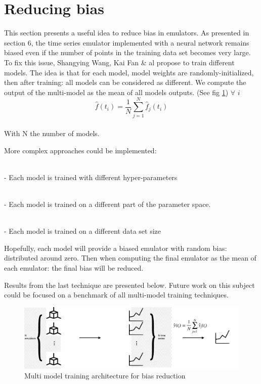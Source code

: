 \documentclass{article}
\begin{document}
\section{Reducing bias}
This section presents a useful idea to reduce bias in emulators. As presented in section 6, the time series emulator implemented with a neural network remains biased even if the number of points in the training data set becomes very large. To fix this issue, Shangying Wang, Kai Fan & al  \cite{emulation_using_NN} propose to train different models.  The idea is that for each model, model weights are randomly-initialized, then after training: all models can be considered as different. We compute the output of the multi-model as the mean of all models outputs. (See fig \ref{fig: multi_model})
$\forall$ $i$
\begin{equation}
    \hat{f}(t_i)= \frac{1}{N} \sum^N_{j=1} \hat{f}_j(t_i)
\end{equation}
 \\ 
With N the number of models.

More complex approaches could be implemented: 

\\ - Each model is trained with different hyper-parameters

\\ - Each model is trained on a different part of the parameter space.

\\ - Each model is trained on a different data set size 

Hopefully, each model will provide a biased emulator with random bias: distributed around zero. Then when computing the final emulator as the mean of each emulator: the final bias will be reduced.    

Results from the last technique are presented below. Future work on this subject could be focused on a benchmark of all multi-model training techniques. 

\begin{figure}[H]
\centering
\includegraphics[scale=0.4]{image/multi_model.png}
\caption{Multi model training architecture for bias reduction}
\label{fig: multi_model}
\end{figure}
\end{document}
